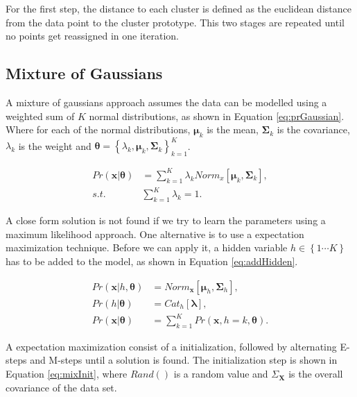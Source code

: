 \documentclass[12pt]{article}
\begin{document}
For the first step, the distance to each cluster is defined as the euclidean distance from the data point to the cluster prototype.
This two stages are repeated until no points get reassigned in one iteration.
 
\subsection{Mixture of Gaussians}

A mixture of gaussians approach assumes the data can be modelled using a weighted sum of $K$ normal distributions, as shown in Equation \ref{eq:prGaussian}.
Where for each of the normal distributions, $\boldsymbol{\mu}_k$ is the mean, $\mathbf{\Sigma}_k$ is the covariance, $\lambda_k$ is the weight and $\boldsymbol{\theta} = \left\{ \lambda_k, \boldsymbol{\mu}_k, \mathbf{\Sigma}_k \right\}_{k=1}^K $.

\begin{equation}
\begin{split}
\label{eq:prGaussian}
Pr(\mathbf{x}|\boldsymbol{\theta}) &= \sum_{k=1}^K \lambda_k Norm_x \left[ \boldsymbol{\mu}_k, \mathbf{\Sigma}_k \right],\\
s.t. \qquad & \sum_{k = 1}^K \lambda_k = 1.
\end{split}
\end{equation}

A close form solution is not found if we try to learn the parameters using a maximum likelihood approach.
One alternative is to use a expectation maximization technique.
Before we can apply it, a hidden variable $h \in \left\{ 1 \cdots K \right\} $ has to be added to the model, as shown in Equation \ref{eq:addHidden}.

\begin{equation}
\begin{split}
\label{eq:addHidden}
Pr(\mathbf{x}| h, \boldsymbol{\theta} ) &= Norm_{\mathbf{x}} \left[ \boldsymbol{\mu}_h, \mathbf{\Sigma}_h \right],\\
Pr(h | \boldsymbol{\theta}) &= Cat_h \left[ \boldsymbol{\lambda} \right],\\
Pr(\mathbf{x}| \boldsymbol{\theta}) &= \sum_{k=1}^K Pr(\mathbf{x}, h = k, \boldsymbol{\theta}).
\end{split}
\end{equation}


A expectation maximization consist of a initialization, followed by alternating E-steps and M-steps until a solution is found.
The initialization step is shown in Equation \ref{eq:mixInit}, where $Rand()$ is a random value and $\Sigma_{\mathbf{X}}$ is the overall covariance of the data set.
\end{document}
